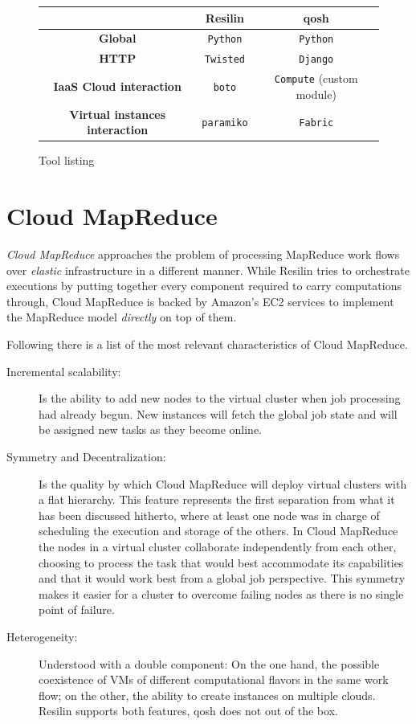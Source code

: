 \begin{figure}[tbp]
\begin{center}
\begin{tabular}{|c|c|c|}
\hline
& \textbf{Resilin} & \textbf{qosh} \\
\hline
\textbf{Global} & \texttt{Python} & \texttt{Python} \\
\hline
\textbf{HTTP} & \texttt{Twisted} & \texttt{Django} \\
\hline
\textbf{IaaS Cloud interaction} & \texttt{boto} & \texttt{Compute} (custom module) \\
\hline
\textbf{Virtual instances interaction} & \texttt{paramiko} & \texttt{Fabric} \\
\hline
\end{tabular}
\caption{Tool listing}
\label{fig:resilinproyecto}
\end{center}
\end{figure}

\section{Cloud MapReduce}\label{sec:cloudmapred}
\noindent \emph{Cloud MapReduce} approaches the problem of processing MapReduce work flows over \emph{elastic} infrastructure in a different manner. While Resilin tries to orchestrate executions by putting together every component required to carry computations through, Cloud MapReduce is backed by Amazon's EC2 services to implement the MapReduce model \cite{googlemapreduce} \emph{directly} on top of them.

Following there is a list of the most relevant characteristics of Cloud MapReduce.

\begin{description}
    \item[Incremental scalability:] Is the ability to add new nodes to the virtual cluster when job processing had already begun. New instances will fetch the global job state and will be assigned new tasks as they become online.
    \item[Symmetry and Decentralization:] Is the quality by which Cloud MapReduce will deploy virtual clusters with a flat hierarchy. This feature represents the first separation from what it has been discussed hitherto, where at least one node was in charge of scheduling the execution and storage of the others. In Cloud MapReduce the nodes in a virtual cluster collaborate independently from each other, choosing to process the task that would best accommodate its capabilities and that it would work best from a global job perspective. This symmetry makes it easier for a cluster to overcome failing nodes as there is no single point of failure.
    \item[Heterogeneity:] Understood with a double component: On the one hand, the possible coexistence of VMs of different computational flavors in the same work flow; on the other, the ability to create instances on multiple clouds. Resilin supports both features, qosh does not out of the box.
\end{description}

